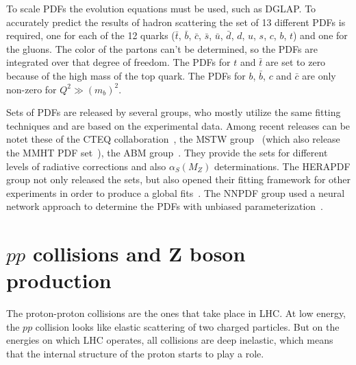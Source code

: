 To scale PDFs the evolution equations must be used, such as DGLAP. To accurately predict the results of hadron scattering the set of 13 different PDFs is required, one for each of the 12 quarks ($\bar{t}$, $\bar{b}$, $\bar{c}$, $\bar{s}$, $\bar{u}$, $\bar{d}$, $d$, $u$, $s$, $c$, $b$, $t$) and one for the gluons. The color of the partons can't be determined, so the PDFs are integrated over that degree of freedom. The PDFs for $t$ and $\bar{t}$ are set to zero because of the high mass of the top quark. The PDFs for $b$, $\bar{b}$, $c$ and $\bar{c}$ are only non-zero for $Q^{2} \gg (m_{b})^{2}$.

Sets of PDFs are released by several groups, who mostly utilize the same fitting techniques and are based on the experimental data. Among recent releases can be notet these of the CTEQ collaboration~\cite{lib:MC_pdfct10}, the MSTW group~\cite{lib:MC_pdfmstw1, lib:MC_pdfmstw2} (which also release the MMHT PDF set~\cite{lib:MC_pdfmmht}), the ABM group~\cite{lib:MC_pdfabm}. They provide the sets for different levels of radiative corrections and also $\alpha_{S}(M_{Z})$ determinations. The HERAPDF group not only released the sets, but also opened their fitting framework for other experiments in order to produce a global fits~\cite{lib:MC_pdfhera}. The NNPDF group used a neural network approach to determine the PDFs with unbiased parameterization~\cite{lib:MC_nnpdf1,lib:MC_nnpdf2,lib:MC_nnpdf3}.

\section{$pp$ collisions and Z boson production}

The proton-proton collisions are the ones that take place in LHC. At low energy, the $pp$ collision looks like elastic scattering of two charged particles. But on the energies on which LHC operates, all collisions are deep inelastic, which means that the internal structure of the proton starts to play a role.

\begin{figure}
\end{figure}

